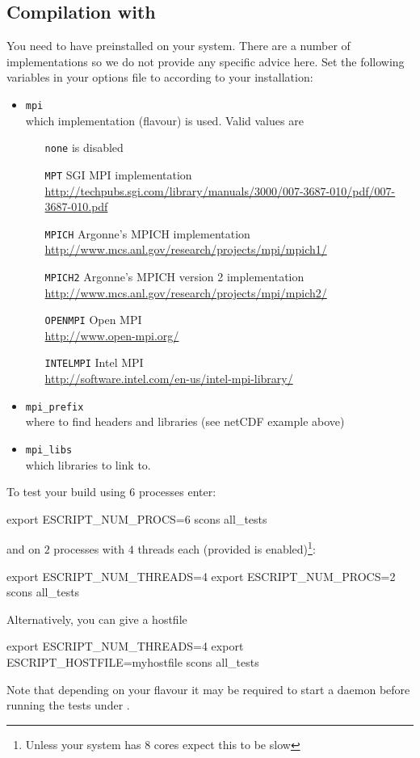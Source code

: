 \subsection{Compilation with \mpi}
You need to have \mpi preinstalled on your system.
There are a number of implementations so we do not provide any specific advice
here.
Set the following variables in your options file to according to your
installation:
\begin{itemize}
 \item \texttt{mpi} \\
    which \mpi implementation (flavour) is used. Valid values are
    \begin{itemize}
        \item[\texttt{none}] \mpi is disabled
        \item[\texttt{MPT}] SGI MPI implementation \\
            \url{http://techpubs.sgi.com/library/manuals/3000/007-3687-010/pdf/007-3687-010.pdf}
        \item[\texttt{MPICH}] Argonne's MPICH implementation \\
            \url{http://www.mcs.anl.gov/research/projects/mpi/mpich1/}
        \item[\texttt{MPICH2}] Argonne's MPICH version 2 implementation \\
            \url{http://www.mcs.anl.gov/research/projects/mpi/mpich2/}
        \item[\texttt{OPENMPI}] Open MPI \\
            \url{http://www.open-mpi.org/}
        \item[\texttt{INTELMPI}] Intel MPI \\
            \url{http://software.intel.com/en-us/intel-mpi-library/}
    \end{itemize}
 \item \texttt{mpi_prefix} \\
    where to find \mpi headers and libraries (see netCDF example above)
 \item \texttt{mpi_libs} \\
    which libraries to link to.
\end{itemize}

To test your build using 6 processes enter:
\begin{shellCode}
export ESCRIPT_NUM_PROCS=6
scons all_tests
\end{shellCode}
and on $2$ processes with $4$ threads each (provided \openmp is enabled)\footnote{Unless your system has $8$ cores expect this to be slow}:
\begin{shellCode}
export ESCRIPT_NUM_THREADS=4
export ESCRIPT_NUM_PROCS=2
scons all_tests
\end{shellCode}
Alternatively, you can give a hostfile
\begin{shellCode}
export ESCRIPT_NUM_THREADS=4
export ESCRIPT_HOSTFILE=myhostfile
scons all_tests
\end{shellCode}
Note that depending on your \mpi flavour it may be required to start a daemon
before running the tests under \mpi.

